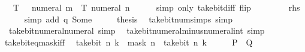 \begin{isabellebody}
\ {\isacartoucheopen}{\isasymdots}\ {\isacharequal}{\kern0pt}\ {\isacharquery}{\kern0pt}T\ {\isacharparenleft}{\kern0pt}{}\ {\isacharcircum}{\kern0pt}\ numeral\ m\ {\isacharminus}{\kern0pt}\ {\isacharquery}{\kern0pt}T\ {\isacharparenleft}{\kern0pt}numeral\ n{\isacharparenright}{\kern0pt}{\isacharparenright}{\kern0pt}{\isacartoucheclose}\isanewline
\ \ \ \ \isamarkupfalse%
\ {\isacharparenleft}{\kern0pt}simp\ only{\isacharcolon}{\kern0pt}\ take{\isacharunderscore}{\kern0pt}bit{\isacharunderscore}{\kern0pt}diff\ flip{\isacharcolon}{\kern0pt}\ {\isacharasterisk}{\kern0pt}{\isacharparenright}{\kern0pt}\isanewline
\ \ \isamarkupfalse%
\ \isamarkupfalse%
\ {\isacartoucheopen}{\isasymdots}\ {\isacharequal}{\kern0pt}\ {\isacharquery}{\kern0pt}rhs{\isacartoucheclose}\isanewline
\ \ \ \ \isamarkupfalse%
\ {\isacharparenleft}{\kern0pt}simp\ add{\isacharcolon}{\kern0pt}\ q\ Some{\isacharparenright}{\kern0pt}\isanewline
\ \ \isamarkupfalse%
\ \isamarkupfalse%
\ {\isacharquery}{\kern0pt}thesis\ \isacommand{{\isachardot}{\kern0pt}}\isamarkupfalse%
\isanewline
{}\isamarkupfalse%
%
\endisatagproof
{\isafoldproof}%
%
\isadelimproof
\isanewline
%
\endisadelimproof
\isanewline
{}\isamarkupfalse%
\ take{\isacharunderscore}{\kern0pt}bit{\isacharunderscore}{\kern0pt}num{\isacharunderscore}{\kern0pt}simps\ {\isacharbrackleft}{\kern0pt}simp{\isacharbrackright}{\kern0pt}\isanewline
\ \ take{\isacharunderscore}{\kern0pt}bit{\isacharunderscore}{\kern0pt}numeral{\isacharunderscore}{\kern0pt}numeral\ {\isacharbrackleft}{\kern0pt}simp{\isacharbrackright}{\kern0pt}\isanewline
\ \ take{\isacharunderscore}{\kern0pt}bit{\isacharunderscore}{\kern0pt}numeral{\isacharunderscore}{\kern0pt}minus{\isacharunderscore}{\kern0pt}numeral{\isacharunderscore}{\kern0pt}int\ {\isacharbrackleft}{\kern0pt}simp{\isacharbrackright}{\kern0pt}%
\isadelimdocument
%
\endisadelimdocument
%
\isatagdocument
%
\isamarkuptrue%
%
\endisatagdocument
{\isafolddocument}%
%
\isadelimdocument
%
\endisadelimdocument
{}\isamarkupfalse%
\ take{\isacharunderscore}{\kern0pt}bit{\isacharunderscore}{\kern0pt}eq{\isacharunderscore}{\kern0pt}mask{\isacharunderscore}{\kern0pt}iff{\isacharcolon}{\kern0pt}\isanewline
\ \ {\isacartoucheopen}take{\isacharunderscore}{\kern0pt}bit\ n\ k\ {\isacharequal}{\kern0pt}\ mask\ n\ {\isasymlongleftrightarrow}\ take{\isacharunderscore}{\kern0pt}bit\ n\ {\isacharparenleft}{\kern0pt}k\ {\isacharplus}{\kern0pt}\ {}{\isacharparenright}{\kern0pt}\ {\isacharequal}{\kern0pt}\ {}{\isacartoucheclose}\ {\isacharparenleft}{\kern0pt}\ {\isacartoucheopen}{\isacharquery}{\kern0pt}P\ {\isasymlongleftrightarrow}\ {\isacharquery}{\kern0pt}Q{\isacartoucheclose}{\isacharparenright}{\kern0pt}\isanewline

\end{isabellebody}
